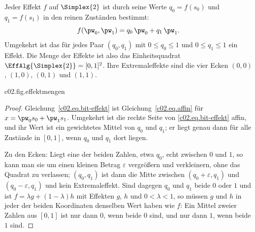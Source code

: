 \begin{proposition}\label{c02.prop.bit}
  Jeder Effekt $f$ auf $\Simplex{2}$ ist durch seine Werte $q_0 = f(s_0)$ und
  $q_1 = f(s_1)$ in den reinen Zuständen bestimmt:
  \begin{equation}\label{c02.eq.bit-effekt}
    f(\pw_0, \pw_1) = q_0\, \pw_0 + q_1\, \pw_1 .
  \end{equation}
  Umgekehrt ist das für jedes Paar $(q_0, q_1)$ mit $0 \leq q_0 \leq 1$ und
  $0 \leq q_1 \leq 1$ ein Effekt. Die Menge der Effekte ist also das Einheitsquadrat
  $\EffAlg{\Simplex{2}} = [0,1]^2$. Ihre Extremaleffekte sind die vier Ecken
  $(0,0)$, $(1,0)$, $(0,1)$ und $(1,1)$.
\end{proposition}

\begin{tpcfigure}{c02.fig.effektmengen}
  \caption{Die Effektmengen zweier Theorien. (a) Klassisches Bit: das Einheitsquadrat in
    den Koordinaten $q_0 = f(s_0)$, $q_1 = f(s_1)$. Der Punkt $f$ ist der Effekt aus
    Abbildung~\ref{c02.fig.niveaulinien}(a). (b) Quadrat-Bit, im Vorgriff auf
    Proposition~\ref{c02.prop.quadrat}: eine Doppelpyramide; nach oben ist $b$ aufgetragen, waagerecht $a_x$ und
    $a_y$. Die Extremaleffekte sind als Quadrate markiert, verdeckte Kanten gepunktet. Beim
    Bit gibt es vier Extremaleffekte zu zwei reinen Zuständen, beim Quadrat-Bit sechs zu
    vier reinen Zuständen.}
\end{tpcfigure}

\begin{proof}
  Gleichung~\eqref{c02.eq.bit-effekt} ist Gleichung~\eqref{c02.eq.affin} für
  $x = \pw_0 s_0 + \pw_1 s_1$. Umgekehrt ist die rechte Seite von
  \eqref{c02.eq.bit-effekt} affin, und ihr Wert ist ein gewichtetes Mittel von $q_0$ und
  $q_1$; er liegt genau dann für alle Zustände in $[0,1]$, wenn $q_0$ und $q_1$ dort
  liegen.

  Zu den Ecken: Liegt eine der beiden Zahlen, etwa $q_0$, echt zwischen $0$ und $1$, so
  kann man sie um einen kleinen Betrag $\varepsilon$ vergrößern und verkleinern, ohne das
  Quadrat zu verlassen; $(q_0, q_1)$ ist dann die Mitte zwischen
  $(q_0 + \varepsilon, q_1)$ und $(q_0 - \varepsilon, q_1)$ und kein Extremaleffekt. Sind
  dagegen $q_0$ und $q_1$ beide $0$ oder $1$ und ist $f = \lambda g + (1-\lambda) h$ mit
  Effekten $g$, $h$ und $0 < \lambda < 1$, so müssen $g$ und $h$ in jeder der beiden
  Koordinaten denselben Wert haben wie $f$: Ein Mittel zweier Zahlen aus $[0,1]$ ist nur
  dann $0$, wenn beide $0$ sind, und nur dann $1$, wenn beide $1$ sind.
\end{proof}

